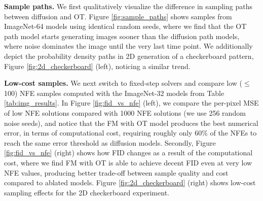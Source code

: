 \documentclass{article}
\newcommand{\yl}[1]{{\color{magenta}{\bf[Yaron:} #1{\bf]}}}
\def\ra{{\textnormal{a}}}
\renewcommand{\ra}[1]{\renewcommand{\arraystretch}{#1}}
\begin{document}
\textbf{Sample paths.} We first qualitatively visualize the difference in sampling paths between diffusion and OT. Figure \ref{fig:sample_paths} shows samples from ImageNet-64 models using identical random seeds, where we find that the OT path model starts generating images sooner than the diffusion path models, where noise dominates the image until the very last time point.
We additionally depict the probability density paths in 2D generation of a checkerboard pattern, Figure \ref{fig:2d_checkerboard} (left), noticing a similar trend.

%

\textbf{Low-cost samples.} We next switch to fixed-step solvers and compare low ($\leq$100) NFE samples computed with the ImageNet-32 models from Table \ref{tab:img_results}. 
In Figure \ref{fig:fid_vs_nfe} (left), we compare the per-pixel MSE of low NFE solutions compared with 1000 NFE solutions (we use 256 random noise seeds), and notice that the FM with OT model produces the best numerical error, in terms of computational cost, requiring roughly only 60\% of the NFEs to reach the same error threshold as diffusion models. Secondly, Figure \ref{fig:fid_vs_nfe} (right) shows how FID changes as a result of the computational cost, where we find FM with OT is able to achieve decent FID even at very low NFE values, producing better trade-off between sample quality and cost compared to ablated models. Figure \ref{fig:2d_checkerboard} (right) shows low-cost sampling effects for the 2D checkerboard experiment. \vspace{-3pt}
\end{document}
